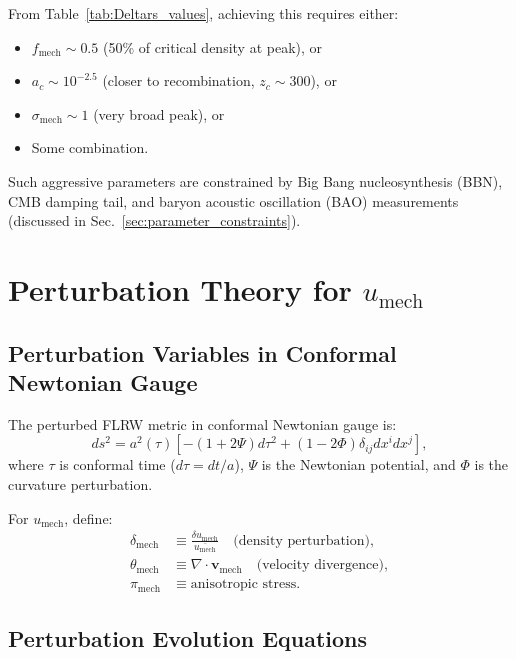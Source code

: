 \documentclass[11pt,a4paper]{article}
\newcommand{\umech}{\ensuremath{u_{\mathrm{mech}}}}
\newcommand{\fmech}{\ensuremath{f_{\mathrm{mech}}}}
\newcommand{\ac}{\ensuremath{a_c}}
\newcommand{\sigmamech}{\ensuremath{\sigma_{\mathrm{mech}}}}
\theoremstyle{definition}
\theoremstyle{remark}
\begin{document}
From Table~\ref{tab:Deltars_values}, achieving this requires either:
\begin{itemize}[leftmargin=*, itemsep=0.2em]
\item $\fmech \sim 0.5$ (50\% of critical density at peak), or
\item $\ac \sim 10^{-2.5}$ (closer to recombination, $z_c \sim 300$), or
\item $\sigmamech \sim 1$ (very broad peak), or
\item Some combination.
\end{itemize}

Such aggressive parameters are constrained by Big Bang nucleosynthesis (BBN), CMB damping tail, and baryon acoustic oscillation (BAO) measurements (discussed in Sec.~\ref{sec:parameter_constraints}).

\section{Perturbation Theory for $\umech$}
\label{sec:perturbations}

\subsection{Perturbation Variables in Conformal Newtonian Gauge}
\label{sec:perturbation_variables}

The perturbed FLRW metric in conformal Newtonian gauge is:
\begin{equation}
ds^2 = a^2(\tau)\left[ -(1+2\Psi)d\tau^2 + (1-2\Phi)\delta_{ij}dx^i dx^j \right],
\end{equation}
where $\tau$ is conformal time ($d\tau = dt/a$), $\Psi$ is the Newtonian potential, and $\Phi$ is the curvature perturbation.

For $\umech$, define:
\begin{align}
\delta_{\mathrm{mech}} &\equiv \frac{\delta\umech}{\bar{\umech}} \quad \text{(density perturbation)}, \\
\theta_{\mathrm{mech}} &\equiv \nabla \cdot \mathbf{v}_{\mathrm{mech}} \quad \text{(velocity divergence)}, \\
\pi_{\mathrm{mech}} &\equiv \text{anisotropic stress}.
\end{align}

\subsection{Perturbation Evolution Equations}
\label{sec:perturbation_evolution}
\end{document}
